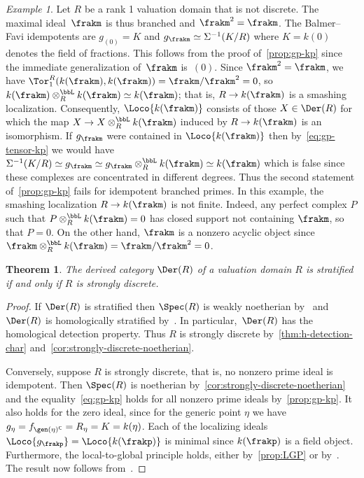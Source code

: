 \documentclass{amsart}
\numberwithin{equation}{section}%
\newtheorem{Thm}[equation]{Theorem}
\theoremstyle{remark}
\newtheorem{Exa}[equation]{Example}
\renewcommand{\complement}{{\mkern-1mu\mathsf{C}}}
\renewcommand{\complement}{{\mathsf{C}}}
\begin{document}
\begin{Exa}
	Let $R$ be a rank 1 valuation domain that is not discrete. The maximal ideal~$\frakm$ is thus branched and $\frakm^2=\frakm$. The Balmer--Favi idempotents are $g_{(0)} = K$ and $g_\frakm \simeq \Sigma^{-1}(K/R)$ where $K=k(0)$ denotes the field of fractions. This follows from the proof of~\cref{prop:gp-kp} since the immediate generalization of~$\frakm$ is~$(0)$. Since $\frakm^2 = \frakm$, we have $\Tor_1^R(k(\frakm),k(\frakm)) = \frakm/\frakm^2 = 0$, so $k(\frakm) \otimes_R^{\bbL} k(\frakm) \simeq k(\frakm)$; that is, $R \to k(\frakm)$ is a smashing localization. Consequently, $\Loco{k(\frakm)}$ consists of those $X \in \Der(R)$ for which the map $X \to X \otimes_R^{\bbL} k(\frakm)$ induced by $R \to k(\frakm)$ is an isomorphism. If $g_\frakm$ were contained in $\Loco{k(\frakm)}$ then by~\eqref{eq:gp-tensor-kp} we would have $\Sigma^{-1}(K/R) \simeq g_\frakm \simeq g_\frakm \otimes_R^{\bbL} k(\frakm) \simeq k(\frakm)$ which is false since these complexes are concentrated in different degrees. Thus the second statement of~\cref{prop:gp-kp} fails for idempotent branched primes. In this example, the smashing localization $R \to k(\frakm)$ is not finite. Indeed, any perfect complex $P$ such that $P \otimes_R^{\bbL} k(\frakm) = 0$ has closed support not containing $\frakm$, so that $P = 0$. On the other hand, $\frakm$ is a nonzero acyclic object since $\frakm \otimes_R^{\bbL} k(\frakm) = \frakm/\frakm^2 = 0$.
\end{Exa}

\begin{Thm}\label{thm:tt-stratified}
	The derived category $\Der(R)$ of a valuation domain $R$ is stratified if and only if $R$ is strongly discrete.
\end{Thm}

\begin{proof}
	If $\Der(R)$ is stratified then $\Spec(R)$ is weakly noetherian by~\cite[Theorem~8.13]{Zou25} and $\Der(R)$ is homologically stratified by~\cite[Theorem~9.6]{BarthelHeardSandersZou26}. In particular,~$\Der(R)$ has the homological detection property. Thus $R$ is strongly discrete by~\cref{thm:h-detection-char} and~\cref{cor:strongly-discrete-noetherian}.

	Conversely, suppose $R$ is strongly discrete, that is, no nonzero prime ideal is idempotent. Then $\Spec(R)$ is noetherian by~\cref{cor:strongly-discrete-noetherian} and the equality~\eqref{eq:gp-kp} holds for all nonzero prime ideals by~\cref{prop:gp-kp}. It also holds for the zero ideal, since for the generic point $\eta$ we have $g_\eta = f_{\gen(\eta)^\complement} = R_\eta = K = k(\eta)$. Each of the localizing ideals $\Loco{g_\frakp}=\Loco{k(\frakp)}$ is minimal since $k(\frakp)$ is a field object. Furthermore, the local-to-global principle holds, either by~\cref{prop:LGP} or by~\cite[Theorem~3.22]{BarthelHeardSanders23a}. The result now follows from~\cite[Theorem~4.1]{BarthelHeardSanders23a}.
\end{proof}
\end{document}
